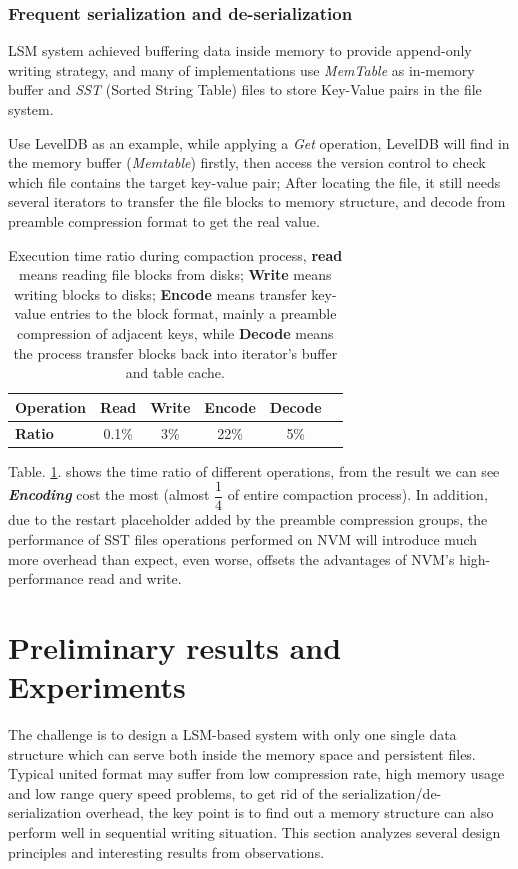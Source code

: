 \subsubsection{Frequent serialization and de-serialization}

LSM system achieved buffering data inside memory to provide append-only writing strategy, and many of implementations use \textit{MemTable} as in-memory buffer and \textit{SST} (Sorted String Table) files to store Key-Value pairs in the file system. 

Use LevelDB\cite{LevelDBo44:online} as an example, while applying a \textit{Get} operation, LevelDB will find in the memory buffer (\textit{Memtable}) firstly, then access the version control to check which file contains the target key-value pair; After locating the file, it still needs several iterators to transfer the file blocks to memory structure, and decode from preamble compression format to get the real value. 
\begin{table}[t]
	\centering
	\begin{tabular}{|l|c|c|c|c|c|}
		\hline
		\textbf{Operation} & Read & Write & Encode & Decode  \\ \hline
		\textbf{Ratio} & 0.1\% & 3\% & 22\% & 5\%  \\ \hline
	\end{tabular}
	\caption{Execution time ratio during compaction process, \textbf{read} means reading file blocks from disks; \textbf{Write} means writing blocks to disks; \textbf{Encode} means transfer key-value entries to the block format, mainly a 
		preamble compression of adjacent keys, while \textbf{Decode} means the process transfer blocks back into iterator's buffer and table cache.}
	\label{tab:file_read_ratio}
\end{table}

Table. \ref{tab:file_read_ratio}. shows the time ratio of different operations, from the result we can see \textbf{\textit{Encoding}} cost the most (almost $\dfrac{1}{4}$ of entire compaction process). In addition, due to the restart placeholder added by the preamble compression groups, the performance of SST files operations performed on NVM will introduce much more overhead than expect, even worse, offsets the advantages of NVM's high-performance read and write.

\section{Preliminary results and Experiments}
The challenge is to design a LSM-based system with only one single data structure which can serve both inside the memory space and persistent files. Typical united format may suffer from low compression rate, high memory usage and low range query speed problems, to get rid of the serialization/de-serialization overhead, the key point is to find out a memory structure can also perform well in sequential writing situation. This section analyzes several design principles and interesting results from observations.

